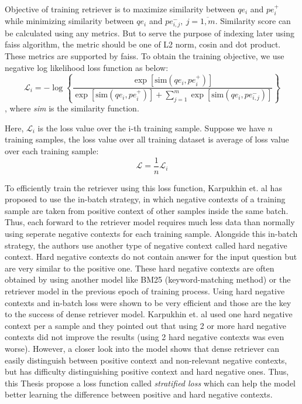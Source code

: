 \documentclass[3p, sort&compress, 12pt]{elsarticle}
\begin{document}
\par Objective of training retriever is to maximize similarity between $qe_i$ and $pe^+_i$ while minimizing similarity between $qe_i$ and $pe_{i,j}^-, \: j=\overline{1, m}$. Similarity score can be calculated using any metrics. But to serve the purpose of indexing later using faiss algorithm, the metric should be one of L2 norm, cosin and dot product. These metrics are supported by faiss. To obtain the training objective, we use negative log likelihood loss function as below:
\begin{equation}
	\label{eq:01}
	\mathcal{L}_i = -\log\left\{\dfrac{\exp\left[{\text{sim}\left(qe_i, pe_i^+\right)}\right]}{\exp\left[{\text{sim}\left(qe_i, pe_i^+\right)}\right] + \sum\limits_{j=1}^m\exp\left[\text{sim}\left(qe_i, pe_{i,j}^-\right)\right]}\right\}
\end{equation},
where \textit{sim} is the similarity function.
\par Here, $\mathcal{L}_i$ is the loss value over the i-th training sample. Suppose we have $n$ training samples, the loss value over all training dataset is average of loss value over each training sample:
\begin{equation}
	\mathcal{L} = \dfrac{1}{n}\mathcal{L}_i
\end{equation}
\par To efficiently train the retriever using this loss function, Karpukhin et. al \cite{karpukhin2020dense} has proposed to use the in-batch strategy, in which negative contexts of a training sample are taken from positive context of other samples inside the same batch. Thus, each forward to the retriever model requires much less data than normally using seperate negative contexts for each training sample. Alongside this in-batch strategy, the authors use another type of negative context called hard negative context. Hard negative contexts do not contain answer for the input question but are very similar to the positive one. These hard negative contexts are often obtained by using another model like BM25 (keyword-matching method) or the retriever model in the previous epoch of training process. Using hard negative contexts and in-batch loss were shown to be very efficient and those are the key to the success of dense retriever model. Karpukhin et. al used one hard negative context per a sample and they pointed out that using 2 or more hard negative contexts did not improve the results (using 2 hard negative contexts was even worse). However, a closer look into the model shows that dense retriever can easily distinguish between positive context and non-relevant negative contexts, but has difficulty distinguishing positive context and hard negative ones. Thus, this Thesis propose a loss function called \textit{stratified loss} which can help the model better learning the difference between positive and hard negative contexts.
\end{document}
